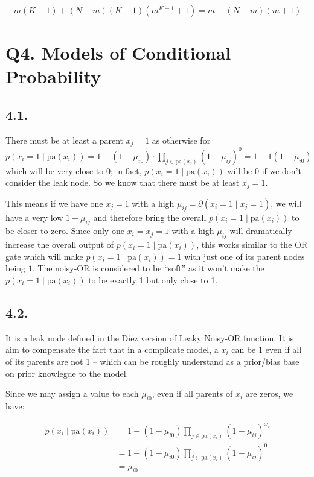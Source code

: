 \documentclass[11pt]{article}
\newcommand{\p}{\partial}
\begin{document}
\begin{equation*}
    m(K-1) + (N-m)(K-1)(m^{K-1} + 1)= m + (N-m)(m + 1)
\end{equation*}

\section*{Q4. Models of Conditional Probability}


\subsection*{4.1.}

There must be at least a parent $x_j = 1$ as otherwise for $p(x_i = 1 \mid \textrm{pa}(x_i)) = 1 - (1 - \mu_{i0}) \cdot \prod_{j \in \textrm{pa}(x_i)} (1 - \mu_{ij})^0 = 1 - 1(1 - \mu_{i0})$ which will be very close to $0$; in fact, $p(x_i = 1 \mid \textrm{pa}(x_i))$ will be $0$ if we don't consider the leak node. So we know that there must be at least $x_j = 1$.\newline

This means if we have one $x_j = 1$ with a high $\mu_{ij} = \p(x_i = 1 \mid x_j = 1)$, we will have a very low $1 - \mu_{ij}$ and therefore bring the overall $p(x_i = 1 \mid \textrm{pa}(x_i))$ to be closer to zero. Since only one $x_i = x_j = 1$ with a high $\mu_{ij}$ will dramatically increase the overall output of  $p(x_i = 1 \mid \textrm{pa}(x_i))$, this works similar to the OR gate which will make $p(x_i = 1 \mid \textrm{pa}(x_i)) = 1$ with just one of its parent nodes being $1$. The noisy-OR is considered to be ``soft'' as it won't make the $p(x_i = 1 \mid \textrm{pa}(x_i))$ to be exactly 1 but only close to 1.

\subsection*{4.2.}

It is a leak node defined in the D\'{i}ez version of Leaky Noisy-OR function. It is aim to compensate the fact that in a complicate model, a $x_i$ can be 1 even if all of its parents are not 1 -- which can be roughly understand as a prior/bias base on prior knowlegde to the model.

Since we may assign a value to each $\mu_{i0}$, even if all parents of $x_i$ are zeros, we have:

\begin{align*}
    p(x_i \mid \textrm{pa}({x_i})) &= 1 - (1 - \mu_{i0}) \prod_{j \in \textrm{pa}(x_i)}(1 - \mu_{ij})^{x_j} \\
    &= 1 - (1 - \mu_{i0}) \prod_{j \in \textrm{pa}(x_i)}(1 - \mu_{ij})^0 \\
    &= \mu_{i0}
\end{align*}
\end{document}
